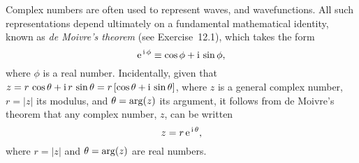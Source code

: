 Complex numbers are often used to represent waves, and wavefunctions. All such representations  depend ultimately on a fundamental mathematical identity, known as
{\em de Moivre's theorem}\/ (see Exercise~12.1), which takes the form
\begin{equation}
{\rm e}^{\,{\rm i}\,\phi} \equiv \cos\phi + {\rm i}\,\sin\phi,
\end{equation}
where $\phi$ is a  real number. Incidentally, given that $z=r\,\cos\theta + {\rm i}\,r\,\sin\theta= r\,[\cos\theta+{\rm i}\,\sin\theta]$, where $z$ is a general
complex number, $r=|z|$  its modulus, and $\theta={\rm arg}(z)$ its argument, it follows from de Moivre's theorem that any
complex number, $z$, can be written
\begin{equation}
z = r\,{\rm e}^{\,{\rm i}\,\theta},
\end{equation}
where $r=|z|$ and $\theta={\rm arg}(z)$ are real numbers. 

